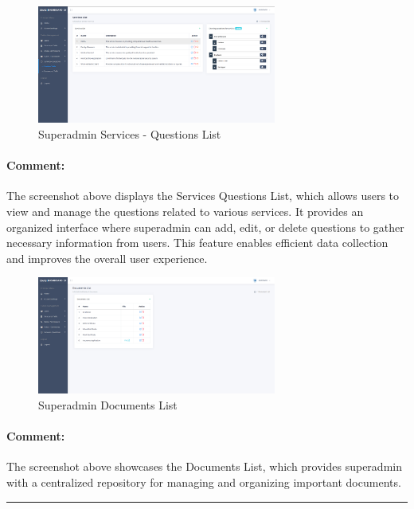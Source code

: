 \begin{itemize}
\begin{figure}[htbp]
    \centering
    \includegraphics[width=0.7\textwidth]{SCREENSHOTS/superadmin/services_questions.png}
    \caption{Superadmin Services - Questions List}
    \label{fig:services-list}
\end{figure}
\paragraph{Comment:} The screenshot above displays the Services Questions List, which allows users to view and manage the questions related to various services. It provides an organized interface where superadmin can add, edit, or delete questions to gather necessary information from users. This feature enables efficient data collection and improves the overall user experience.
\newpage
\begin{figure}[htbp]
    \centering
    \includegraphics[width=0.7\textwidth]{SCREENSHOTS/superadmin/documents_list.png}
    \caption{Superadmin Documents List}
    \label{fig:documents-list}
\end{figure}
\paragraph{Comment:} The screenshot above showcases the Documents List, which provides superadmin with a centralized repository for managing and organizing important documents.

\rule{\linewidth}{1pt}

\vspace{1cm}


\end{itemize}
